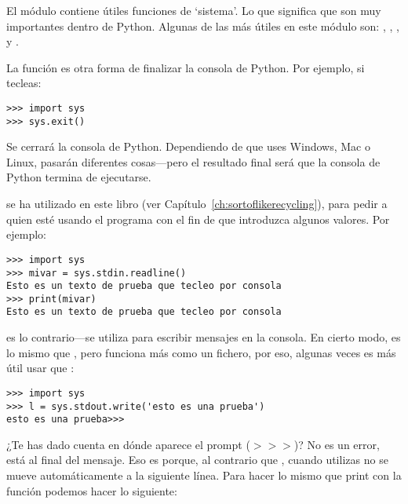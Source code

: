 El módulo  contiene útiles funciones de `sistema'.  Lo que significa que son muy importantes dentro de Python.   Algunas de las más útiles en este módulo  son: , , , y .
\par
La función  es otra forma de finalizar la consola de Python.   Por ejemplo, si tecleas:

\begin{listingignore}
\begin{verbatim}
>>> import sys
>>> sys.exit()
\end{verbatim}
\end{listingignore}

Se cerrará la consola de Python.   Dependiendo de que uses Windows, Mac o Linux, pasarán diferentes cosas---pero el resultado final será que la consola de Python termina de ejecutarse.

 se ha utilizado en este libro (ver Capítulo~\ref{ch:sortoflikerecycling}), para pedir a quien esté usando el programa con el fin de que introduzca algunos valores.   Por ejemplo:

\begin{listingignore}
\begin{verbatim}
>>> import sys
>>> mivar = sys.stdin.readline()
Esto es un texto de prueba que tecleo por consola
>>> print(mivar)
Esto es un texto de prueba que tecleo por consola
\end{verbatim}
\end{listingignore}

 es lo contrario---se utiliza para escribir mensajes en la consola.  En cierto modo, es lo mismo que , pero funciona más como un fichero, por eso, algunas veces es más útil usar  que :

\begin{listingignore}
\begin{verbatim}
>>> import sys
>>> l = sys.stdout.write('esto es una prueba')
esto es una prueba>>>
\end{verbatim}
\end{listingignore}

¿Te has dado cuenta en dónde aparece el prompt ($>>>$)?   No es un error, está al final del mensaje.   Eso es porque, al contrario que ,  cuando utilizas  no se mueve automáticamente a la siguiente línea.   Para hacer lo mismo que print con la función  podemos hacer lo siguiente:

